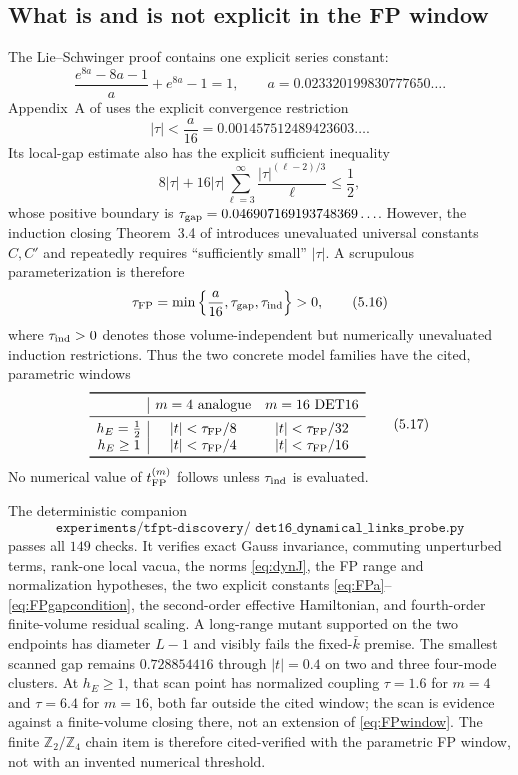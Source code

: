 \subsection{What is and is not explicit in the FP window}

The Lie--Schwinger proof contains one explicit series constant:
\[
 \frac{e^{8a}-8a-1}{a}+e^{8a}-1=1,\qquad
 a=0.023320199830777650\ldots .
\tag{5.14}\label{eq:FPa}
\]
Appendix~A of \cite{FP2020} uses the explicit convergence restriction
\[
 |\tau|<\frac a{16}
 =0.001457512489423603\ldots .
\]
Its local-gap estimate also has the explicit sufficient inequality
\[
 8|\tau|+16|\tau|
 \sum_{\ell=3}^{\infty}
 \frac{|\tau|^{(\ell-2)/3}}{\ell}\leq\frac12,
\tag{5.15}\label{eq:FPgapcondition}
\]
whose positive boundary is
$\tau_{\rm gap}=0.046907169193748369\ldots$.
However, the induction closing Theorem~3.4 of \cite{FP2020} introduces
unevaluated universal constants $C,C'$ and repeatedly requires
``sufficiently small'' $|\tau|$.  A scrupulous parameterization is
therefore
\[
 \tau_{\rm FP}
 =\min\left\{\frac a{16},\tau_{\rm gap},\tau_{\rm ind}\right\}>0,
\tag{5.16}\label{eq:FPparametric}
\]
where $\tau_{\rm ind}>0$ denotes those volume-independent but
numerically unevaluated induction restrictions.  Thus the two concrete
model families have the cited, parametric windows
\[
\begin{array}{c|cc}
\toprule
&m=4\ \text{analogue}&m=16\ \text{DET16}\\
\midrule
h_E=\tfrac12&|t|<\tau_{\rm FP}/8&|t|<\tau_{\rm FP}/32\\
h_E\geq1&|t|<\tau_{\rm FP}/4&|t|<\tau_{\rm FP}/16\\
\bottomrule
\end{array}
\tag{5.17}\label{eq:FPwindows}
\]
No numerical value of $t_{\rm FP}^{(m)}$ follows unless
$\tau_{\rm ind}$ is evaluated.

The deterministic companion
\[
 \texttt{experiments/tfpt-discovery/
 det16\_dynamical\_links\_probe.py}
\]
passes all $149$ checks.  It verifies exact Gauss invariance, commuting
unperturbed terms, rank-one local vacua, the norms
\eqref{eq:dynJ}, the FP range and normalization hypotheses, the two
explicit constants \eqref{eq:FPa}--\eqref{eq:FPgapcondition}, the
second-order effective Hamiltonian, and fourth-order finite-volume
residual scaling.  A long-range mutant supported on the two endpoints
has diameter $L-1$ and visibly fails the fixed-$\bar k$ premise.
The smallest scanned gap remains $0.728854416$ through $|t|=0.4$ on
two and three four-mode clusters.  At $h_E\geq1$, that scan point has
normalized coupling $\tau=1.6$ for $m=4$ and $\tau=6.4$ for $m=16$,
both far outside the cited window; the scan is evidence against a
finite-volume closing there, not an extension of
\eqref{eq:FPwindow}.  The finite $\mathbb Z_2/\mathbb Z_4$ chain item is
therefore cited-verified with the parametric FP window, not with an
invented numerical threshold.

